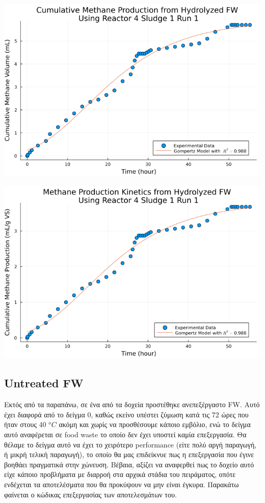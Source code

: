 \documentclass[11pt]{article}
\begin{document}
\begin{center}
\includegraphics[width=.9\linewidth]{../plots/BMPs/Hydrolyzed FW/methane_kinetics_hydrolysate_4_s1_r1_hour.png}
\end{center}

\begin{center}
\includegraphics[width=.9\linewidth]{../plots/BMPs/Hydrolyzed FW/specific_methane_kinetics_hydrolysate_4_s1_r1_hour.png}
\end{center}

\subsection{Untreated FW}
\label{sec:org4cfbe9b}
Εκτός από τα παραπάνω, σε ένα από τα δοχεία προστέθηκε ανεπεξέργαστο FW. Αυτό έχει διαφορά από το δείγμα 0, καθώς εκείνο υπέστει ζύμωση κατά τις 72 ώρες που ήταν στους 40 \(^oC\) ακόμη και χωρίς να προσθέσουμε κάποιο εμβόλιο, ενώ το δείγμα αυτό αναφέρεται σε food waste το οποίο δεν έχει υποστεί καμία επεξεργασία. Θα θέλαμε το δείγμα αυτό να έχει το χειρότερο performance (είτε πολύ αργή παραγωγή, ή μικρή τελική παραγωγή), το οποίο θα μας επιδείκνυε πως η επεξεργασία που έγινε βοηθάει πραγματικά στην χώνευση. Βέβαια, αξίζει να αναφερθεί πως το δοχείο αυτό είχε κάποιο προβλήματα με διαρροή στα αρχικά στάδια του πειράματος, οπότε ενδέχεται τα αποτελέσματα που θα προκύψουν να μην είναι έγκυρα. Παρακάτω φαίνεται ο κώδικας επεξεργασίας των αποτελεσμάτων του.
\end{document}
